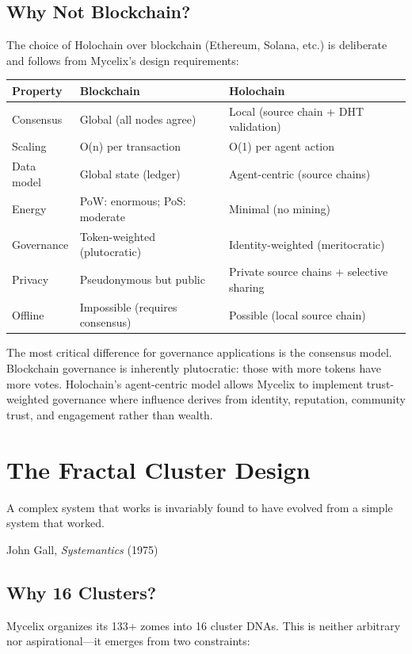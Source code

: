 \documentclass[12pt]{book}
\begin{document}
\section{Why Not Blockchain?}

The choice of Holochain over blockchain (Ethereum, Solana, etc.) is deliberate
and follows from Mycelix's design requirements:

\begin{longtable}{p{4cm}p{4.5cm}p{4.5cm}}
\toprule
\textbf{Property} & \textbf{Blockchain} & \textbf{Holochain} \\
\midrule
\endhead
Consensus & Global (all nodes agree) & Local (source chain + DHT validation) \\
Scaling & O(n) per transaction & O(1) per agent action \\
Data model & Global state (ledger) & Agent-centric (source chains) \\
Energy & PoW: enormous; PoS: moderate & Minimal (no mining) \\
Governance & Token-weighted (plutocratic) & Identity-weighted (meritocratic) \\
Privacy & Pseudonymous but public & Private source chains + selective sharing \\
Offline & Impossible (requires consensus) & Possible (local source chain) \\
\bottomrule
\end{longtable}

The most critical difference for governance applications is the consensus
model. Blockchain governance is inherently plutocratic: those with more tokens
have more votes. Holochain's agent-centric model allows Mycelix to implement
trust-weighted governance where influence derives from identity, reputation,
community trust, and engagement rather than wealth.


\chapter{The Fractal Cluster Design}

\epigraph{A complex system that works is invariably found to have evolved from
a simple system that worked.}{John Gall, \textit{Systemantics} (1975)}

\section{Why 16 Clusters?}

Mycelix organizes its 133+ zomes into 16 cluster DNAs. This is neither arbitrary
nor aspirational---it emerges from two constraints:
\end{document}
